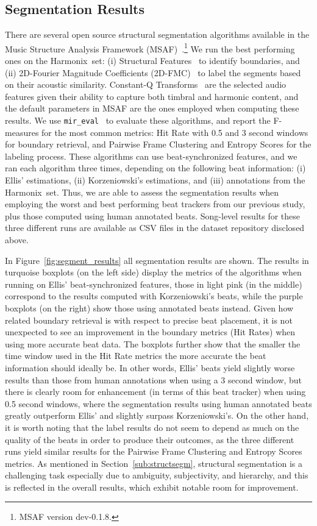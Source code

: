 \documentclass{article}
\newcommand{\setName}{Harmonix}
\begin{document}
\subsection{Segmentation Results}

There are several open source structural segmentation algorithms available in the Music Structure Analysis Framework (MSAF)~\cite{Nieto2016}.\footnote{MSAF version dev-0.1.8.}
We run the best performing ones on the \setName~set: (i) Structural Features~\cite{Serra2014} to identify boundaries, and (ii) 2D-Fourier Magnitude Coefficients (2D-FMC)~\cite{Nieto2014} to label the segments based on their acoustic similarity.
Constant-Q Transforms~\cite{Schorkhuber2010} are the selected audio features given their ability to capture both timbral and harmonic content, and the default parameters in MSAF are the ones employed when computing these results.
We use \texttt{mir\_eval}~\cite{Raffel2014} to evaluate these algorithms, and report the F-measures for the most common metrics: Hit Rate with 0.5 and 3 second windows for boundary retrieval, and Pairwise Frame Clustering and Entropy Scores for the labeling process.
These algorithms can use beat-synchronized features, and we ran each algorithm three times, depending on the following beat information: (i) Ellis' estimations, (ii) Korzeniowski's estimations, and (iii) annotations from the \setName~set.
Thus, we are able to assess the segmentation results when employing the worst and best performing beat trackers from our previous study, plus those computed using human annotated beats.
Song-level results for these three different runs are available as CSV files in the dataset repository disclosed above.

In Figure~\ref{fig:segment_results} all segmentation results are shown.
The results in turquoise boxplots (on the left side) display the metrics of the algorithms when running on Ellis' beat-synchronized features, those in light pink (in the middle) correspond to the results computed with Korzeniowski's beats, while the purple boxplots (on the right) show those using annotated beats instead.
Given how related boundary retrieval is with respect to precise beat placement, it is not unexpected to see an improvement in the boundary metrics (Hit Rates) when using more accurate beat data.
The boxplots further show that the smaller the time window used in the Hit Rate metrics the more accurate the beat information should ideally be.
In other words, Ellis' beats yield slightly worse results than those from human annotations when using a 3 second window, but there is clearly room for enhancement (in terms of this beat tracker) when using 0.5 second windows, where the segmentation results using human annotated beats greatly outperform Ellis' and slightly surpass Korzeniowski's.
On the other hand, it is worth noting that the label results do not seem to depend as much on the quality of the beats in order to produce their outcomes, as the three different runs yield similar results for the Pairwise Frame Clustering and Entropy Scores metrics.
As mentioned in Section~\ref{sub:structsegm}, structural segmentation is a challenging task especially due to ambiguity, subjectivity, and hierarchy, and this is reflected in the overall results, which exhibit notable room for improvement.
\end{document}
